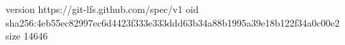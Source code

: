 version https://git-lfs.github.com/spec/v1
oid sha256:4eb55ec82997ec6d4423f333e333ddd63b34a88b1995a39e18b122f34a0c00e2
size 14646
